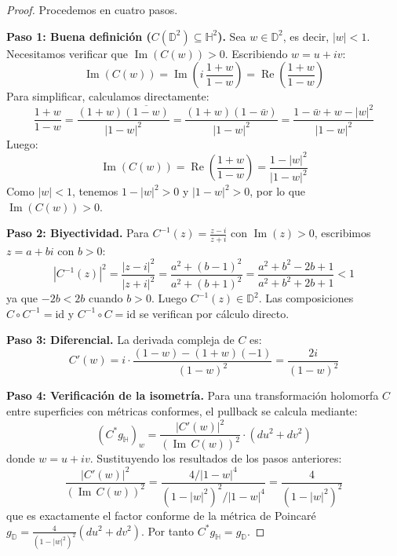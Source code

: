 \begin{proof}
Procedemos en cuatro pasos.

\textbf{Paso 1: Buena definición ($C(\mathbb{D}^2) \subseteq \mathbb{H}^2$).}
Sea $w \in \mathbb{D}^2$, es decir, $|w| < 1$. Necesitamos verificar que $\operatorname{Im}(C(w)) > 0$. Escribiendo $w = u + iv$:
\begin{equation}\label{eq:parte_imaginaria_cayley}
\operatorname{Im}(C(w)) = \operatorname{Im}\!\left(i\,\frac{1+w}{1-w}\right) = \operatorname{Re}\!\left(\frac{1+w}{1-w}\right)
\end{equation}
Para simplificar, calculamos directamente:
\[
\frac{1+w}{1-w} = \frac{(1+w)\overline{(1-w)}}{|1-w|^2} = \frac{(1+w)(1-\bar{w})}{|1-w|^2} = \frac{1 - \bar{w} + w - |w|^2}{|1-w|^2}
\]
Luego:
\[
\operatorname{Im}(C(w)) = \operatorname{Re}\!\left(\frac{1+w}{1-w}\right) = \frac{1 - |w|^2}{|1-w|^2}
\]
Como $|w| < 1$, tenemos $1 - |w|^2 > 0$ y $|1-w|^2 > 0$, por lo que $\operatorname{Im}(C(w)) > 0$.

\textbf{Paso 2: Biyectividad.}
Para $C^{-1}(z) = \frac{z-i}{z+i}$ con $\operatorname{Im}(z) > 0$, escribimos $z = a + bi$ con $b > 0$:
\[
|C^{-1}(z)|^2 = \frac{|z-i|^2}{|z+i|^2} = \frac{a^2 + (b-1)^2}{a^2 + (b+1)^2} = \frac{a^2 + b^2 - 2b + 1}{a^2 + b^2 + 2b + 1} < 1
\]
ya que $-2b < 2b$ cuando $b > 0$. Luego $C^{-1}(z) \in \mathbb{D}^2$. Las composiciones $C \circ C^{-1} = \mathrm{id}$ y $C^{-1} \circ C = \mathrm{id}$ se verifican por cálculo directo.

\textbf{Paso 3: Diferencial.}
La derivada compleja de $C$ es:
\begin{equation}\label{eq:derivada_cayley}
C'(w) = i \cdot \frac{(1-w) - (1+w)(-1)}{(1-w)^2} = \frac{2i}{(1-w)^2}
\end{equation}

\textbf{Paso 4: Verificación de la isometría.}
Para una transformación holomorfa $C$ entre superficies con métricas conformes, el pullback se calcula mediante:
\[
(C^* g_{\mathbb{H}})_w = \frac{|C'(w)|^2}{(\operatorname{Im}\, C(w))^2} \cdot (du^2 + dv^2)
\]
donde $w = u + iv$. Sustituyendo los resultados de los pasos anteriores:
\[
\frac{|C'(w)|^2}{(\operatorname{Im}\, C(w))^2} = \frac{4/|1-w|^4}{(1-|w|^2)^2/|1-w|^4} = \frac{4}{(1-|w|^2)^2}
\]
que es exactamente el factor conforme de la métrica de Poincaré $g_{\mathbb{D}} = \frac{4}{(1-|w|^2)^2}(du^2 + dv^2)$. Por tanto $C^* g_{\mathbb{H}} = g_{\mathbb{D}}$.
\end{proof}

